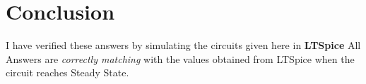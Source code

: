 \documentclass[11pt]{article}
\begin{document}
    \hypertarget{conclusion}{%
\section{Conclusion}\label{conclusion}}

I have verified these answers by simulating the circuits given here in
\textbf{LTSpice} All Answers are \emph{correctly matching} with the
values obtained from LTSpice when the circuit reaches Steady State.


    
    
    
\end{document}
